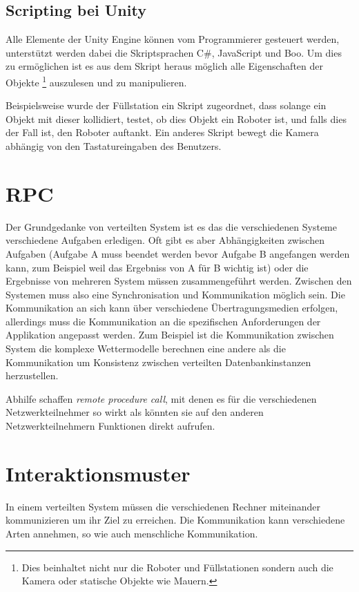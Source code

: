 \subsection{Scripting bei Unity}
Alle Elemente der Unity Engine k{\"{o}}nnen vom Programmierer gesteuert werden, unterst{\"{u}}tzt werden dabei die Skriptsprachen C\#, JavaScript und Boo.\cite{wiki:unity} Um dies zu erm{\"{o}}glichen ist es aus dem Skript heraus m{\"{o}}glich alle Eigenschaften
der Objekte \footnote{Dies beinhaltet nicht nur die Roboter und F{\"{u}}llstationen sondern auch die Kamera oder statische Objekte wie Mauern.} auszulesen und zu manipulieren.

Beispielsweise wurde der F{\"{u}}llstation ein Skript zugeordnet, dass solange ein Objekt mit dieser kollidiert, testet, ob dies Objekt ein Roboter ist, und falls dies der Fall ist,
den Roboter auftankt. Ein anderes Skript bewegt die Kamera abh{\"{a}}ngig von den Tastatureingaben des Benutzers.

\clearpage
\section{RPC}
Der Grundgedanke von verteilten System ist es das die verschiedenen Systeme verschiedene Aufgaben
erledigen. Oft gibt es aber Abh{\"{a}}ngigkeiten zwischen Aufgaben (Aufgabe A muss beendet werden
bevor Aufgabe B angefangen werden kann, zum Beispiel weil das Ergebniss von A f{\"{u}}r B wichtig
ist) oder die Ergebnisse von mehreren System m{\"{u}}ssen zusammengef{\"{u}}hrt werden. Zwischen
den Systemen muss also eine Synchronisation und Kommunikation m{\"{o}}glich sein. Die Kommunikation
an sich kann {\"{u}}ber verschiedene {\"{U}}bertragungsmedien erfolgen, allerdings muss die
Kommunikation an die spezifischen Anforderungen der Applikation angepasst werden. Zum Beispiel
ist die Kommunikation zwischen System die komplexe Wettermodelle berechnen eine andere als die
Kommunikation um Konsistenz zwischen verteilten Datenbankinstanzen herzustellen.

Abhilfe schaffen \textit{remote procedure call}, mit denen es f{\"{u}}r die verschiedenen Netzwerkteilnehmer
so wirkt als k{\"{o}}nnten sie auf den anderen Netzwerkteilnehmern Funktionen direkt aufrufen.


\clearpage
\section{Interaktionsmuster}
In einem verteilten System m{\"{u}}ssen die verschiedenen Rechner miteinander kommunizieren um
ihr Ziel zu erreichen. Die Kommunikation kann verschiedene Arten annehmen, so wie auch menschliche
Kommunikation.

